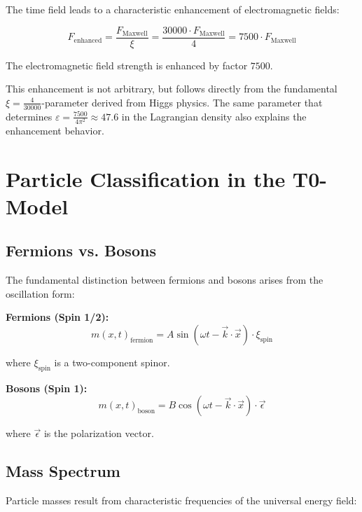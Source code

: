 \documentclass[12pt,a4paper]{report}
\newcommand{\mfield}{m(x,t)}  %
\newcommand{\xipar}{\xi}      %
\begin{document}
	The time field leads to a characteristic enhancement of electromagnetic fields:
	
	\begin{equation}
		F_{\text{enhanced}} = \frac{F_{\text{Maxwell}}}{\xipar} = \frac{30000 \cdot F_{\text{Maxwell}}}{4} = 7500 \cdot F_{\text{Maxwell}}
	\end{equation}
	
	The electromagnetic field strength is enhanced by factor $7500$.
	
	This enhancement is not arbitrary, but follows directly from the fundamental $\xipar = \frac{4}{30000}$-parameter derived from Higgs physics. The same parameter that determines $\varepsilon = \frac{7500}{4\pi^2} \approx 47.6$ in the Lagrangian density also explains the enhancement behavior.
	
	\section{Particle Classification in the T0-Model}\label{sec:particle_classification}
	
	\subsection{Fermions vs. Bosons}\label{subsec:fermions_bosons}
	
	The fundamental distinction between fermions and bosons arises from the oscillation form:
	
	\textbf{Fermions (Spin 1/2):}
	\begin{equation}
		\mfield_{\text{fermion}} = A \sin(\omega t - \vec{k} \cdot \vec{x}) \cdot \xi_{\text{spin}}
	\end{equation}
	
	where $\xi_{\text{spin}}$ is a two-component spinor.
	
	\textbf{Bosons (Spin 1):}
	\begin{equation}
		\mfield_{\text{boson}} = B \cos(\omega t - \vec{k} \cdot \vec{x}) \cdot \vec{\epsilon}
	\end{equation}
	
	where $\vec{\epsilon}$ is the polarization vector.
	
	\subsection{Mass Spectrum}\label{subsec:mass_spectrum}
	
	Particle masses result from characteristic frequencies of the universal energy field:
	
\end{document}
